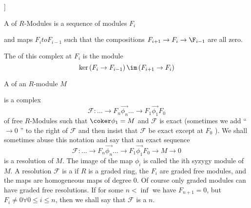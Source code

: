\documentclass{article}
\begin{document}



\begin{defn}[Complex of $R$-modules \nocite[Eis1]{1.10} ]

A  of $R$-Modules is a sequence of modules \( F_{i} \)


and maps \( F_{i} to F_{i-1} \) such that the compositions \( F_{i+1} \to F_{i} \to \F_{i-1} \) are all zero.


The  of this complex at \( F_{i} \) is the module 
\[
	\ker \left( F_{i} \to F_{i-1} \right)   \/ \im \left( F_{i+1} \to F_{i} \right)
\]


A  of an \( R\)-module \( M \)


is a complex
\[
	\mathcal{F}: \hdots \to F_{n} \overset{\to}{\phi_{n}} 
	\hdots \to F_{1} \overset{\to}{\phi_{1}} F_{0}
\]
of free \(R\)-Modules such that \( \coker \phi_{1} = M \) 
and \( \mathcal{F} \)  is exact (sometimes we add `` \( \to 0 \) '' to the right of \(\mathcal{F}\) and then insist that \(\mathcal{F}\) be exact except at \( F_{0} \) ).
We shall sometimes abuse this notation and say that an exact sequence 
\[
	\mathcal{F}: \hdots \to F_{n} \overset{\to}{\phi_{n}} 
	\hdots \to F_{1} \overset{\to}{\phi_{1}} F_{0}
	\to M \to 0
\]
is a resolution of \( M \).  
The image of the map \( \phi_i \) is called the ith syzygy module of \(M \).
A resolution \( \mathcal{F }\) is a  if \( R \) is a graded ring, the \(  F_{i}\) are graded free modules, and the maps are homogeneous maps of degree 0.
Of course only graded modules can have graded free resolutions.
If for some \( n < \inf \) we have \( F_{n+1}=0 \), 
but \( F_{i} \neq 0 \forall 0 \le i \le n \), then we shall say that 
\( \mathcal{F}\) is a  \( n\).
\end{defn}
\end{document}

